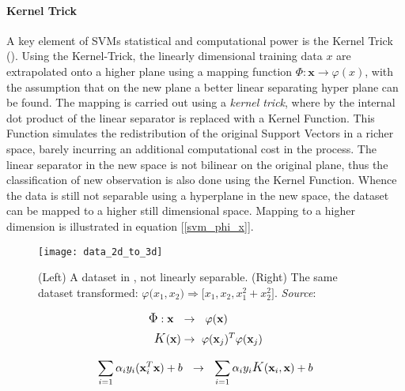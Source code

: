 	\par		
	\paragraph{Kernel Trick}
	A key element of SVMs statistical and computational power is the Kernel Trick (\cite{guyon1993automatic}). Using the Kernel-Trick, the linearly dimensional training data $x$ are extrapolated onto a higher plane using a mapping function $\Phi:\textbf{x} \rightarrow \varphi(x)$, with the assumption that on the new plane a better linear separating hyper plane can be found. The mapping is carried out using a \textit{kernel trick}, where by the internal dot product of the linear separator is replaced with a Kernel Function. This Function simulates the redistribution of the original Support Vectors in a richer space, barely incurring an additional computational cost in the process. The linear separator in the new space is not bilinear on the original plane, thus the classification of new observation is also done using the Kernel Function. Whence the data is still not separable using a hyperplane in the new space, the dataset can be mapped to a higher still dimensional space. Mapping to a higher dimension is illustrated in equation [\ref{svm_phi_x}].
	
	\begin{figure}[h]
		\centering
		\captionsetup{width=0.8\textwidth}
		\texttt{[image: data\_2d\_to\_3d]}
		\caption[SVM Dimensionianl Extrapolation]{
			\footnotesize{
				(Left) A dataset in  , not linearly separable. (Right) The same dataset transformed:
				$\varphi \big(x_1, x_2\big) \Rightarrow \big[ x_1,x_2,x_1^2+x_2^2 \big]$.
				\textit{Source}:\cite{kimso}
			}
		}
	\end{figure}

	\begin{equation}
		\begin{aligned}
			\mathlarger{\Phi}: \textbf{x} \ \ &\rightarrow \ \  \varphi(\textbf{x}) \\
			\mathlarger{K}(\textbf{x}) &\rightarrow \ \varphi(\textbf{x}_j)^T \varphi(\textbf{x}_j)
		\end{aligned}
		\label{svm_phi_x}
	\end{equation}
	
	\begin{equation}
		\sum_{i=1} \alpha_i y_i (\textbf{x}_i^T \textbf{x}) + b  \ \  \rightarrow \ \ 
		\sum_{i=1} \alpha_i y_i \mathlarger{K}(\textbf{x}_i, \textbf{x}) + b
		\label{svm_insert_kernel}
	\end{equation}
	

